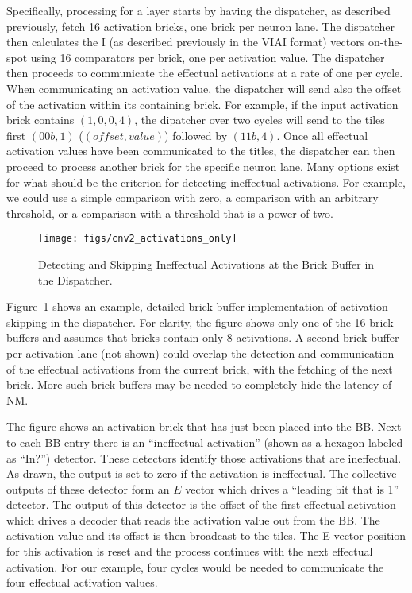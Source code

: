 Specifically, processing for a layer starts by having the dispatcher, as described previously, fetch 16 activation bricks, one brick per neuron lane. The dispatcher then calculates the I (as described previously in the VIAI format) vectors on-the-spot using 16 comparators per brick, one per activation value. The dispatcher then proceeds to communicate the effectual activations at a rate of  one per cycle. When communicating an activation value, the dispatcher will send also the offset of the activation within its containing brick. For example, if the input activation brick contains $(1,0,0,4)$, the dipatcher over two cycles will send to the tiles first $(00b,1)$ ($(offset, value)$) followed by $(11b,4)$. Once all effectual activation values have been communicated to the titles, the dispatcher can then proceed to process another brick for the specific neuron lane. Many options exist for what should be the criterion for detecting ineffectual activations. For example, we could use a simple comparison with zero, a comparison with an arbitrary threshold, or a comparison with a threshold that is a power of two.

\begin{figure}
        \centering
        \texttt{[image: figs/cnv2\_activations\_only]}
   
\caption{Detecting and Skipping Ineffectual Activations at the Brick Buffer in the Dispatcher.}
\label{fig:activationskipping}
\end{figure}

Figure~\ref{fig:activationskipping} shows an example, detailed brick buffer implementation of activation skipping in the dispatcher. For clarity, the figure shows only one of the 16 brick buffers and assumes that bricks contain only 8 activations. A second brick buffer per activation lane (not shown) could overlap the detection and communication of the effectual activations from the current brick, with the fetching of the next brick. More such brick buffers may be needed to completely hide the latency of NM.

The figure shows an activation brick that has just been placed into the BB. Next to each BB entry there is an ``ineffectual activation'' (shown as a hexagon labeled as ``In?'') detector. These detectors identify those activations that are ineffectual. As drawn, the output is set to zero if the activation is ineffectual. The collective outputs of these detector form an $E$ vector which drives a ``leading  bit that is 1'' detector. The output of this detector is the offset of the first effectual activation which drives a decoder that reads the activation value out from the BB. The activation value and its offset is then broadcast to the tiles. The E vector position for this activation is reset and the process continues with the next effectual activation. For our example, four cycles would be needed to communicate the four effectual activation values.

